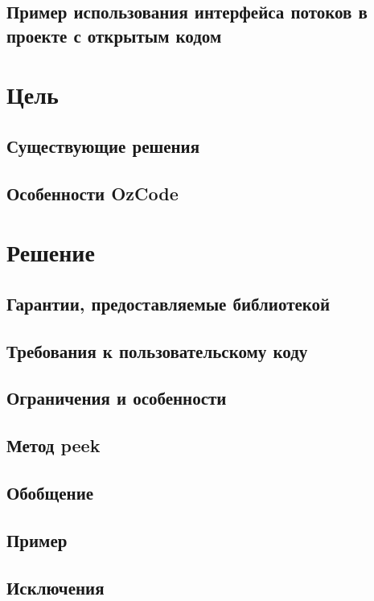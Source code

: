 \subsection{Пример использования интерфейса потоков в проекте с открытым кодом}


\section{Цель}

\subsection{Существующие решения}

\subsection{Особенности OzCode}


\section{Решение}
\subsection{Гарантии, предоставляемые библиотекой}

\subsection{Требования к пользовательскому коду}

\subsection{Ограничения и особенности}


\subsection{Метод peek}


\subsection{Обобщение}

\subsection{Пример}

\subsection{Исключения}

